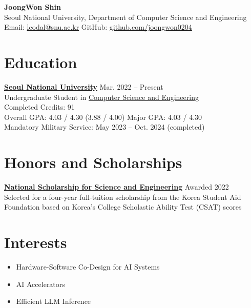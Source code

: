 \documentclass[10pt,a4paper]{article}
\newcommand{\cvitem}[2]{
  \textbf{#1} \hfill #2
}
\begin{document}
\begin{center}
    {\LARGE \textbf{JoongWon Shin}} \\
    Seoul National University, Department of Computer Science and Engineering \\
    Email: \href{mailto:leodal@snu.ac.kr}{leodal@snu.ac.kr}
    \quad \textbar{} \quad
    GitHub: \href{https://github.com/joongwon0204}{github.com/joongwon0204}
\end{center}

\vspace{4pt}

\section*{Education}

\cvitem{\href{https://www.snu.ac.kr/}{Seoul National University}}{Mar. 2022 -- Present} \\
Undergraduate Student in \href{https://cse.snu.ac.kr/}{Computer Science and Engineering} \\
Completed Credits: 91 \\
Overall GPA: 4.03 / 4.30 (3.88 / 4.00) \quad \textbar{} \quad Major GPA: 4.03 / 4.30 \\
Mandatory Military Service: May 2023 -- Oct. 2024 (completed)

\section*{Honors and Scholarships}

\cvitem{\href{https://www.kosaf.go.kr/ko/scholar.do?pg=scholarship05_06_01}{National Scholarship for Science and Engineering}}{Awarded 2022} \\
Selected for a four-year full-tuition scholarship from the Korea Student Aid Foundation based on Korea's College Scholastic Ability Test (CSAT) scores

\section*{Interests}

\begin{itemize}[leftmargin=1.2em, itemsep=2pt]
    \item Hardware-Software Co-Design for AI Systems
    \item AI Accelerators
    \item Efficient LLM Inference
\end{itemize}
\end{document}
